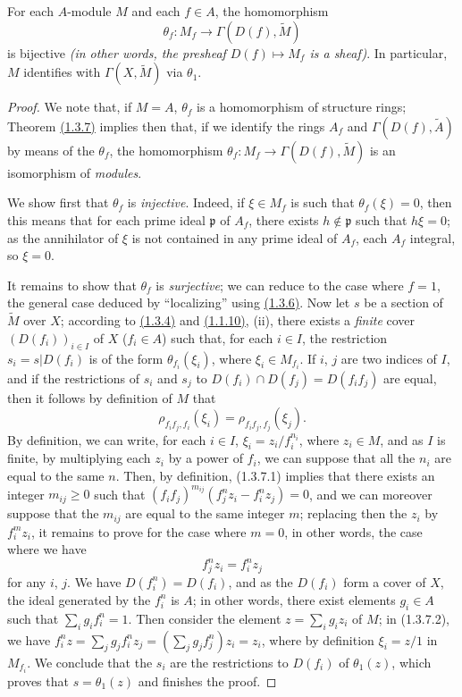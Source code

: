 \begin{thm}[1.3.7]
\label{thm-1.1.3.7}
For each $A$-module $M$ and each $f\in A$, the homomorphism
\[
  \theta_f:M_f\longrightarrow\Gamma(D(f),\widetilde{M})
\]
is bijective {\it (in other words, the presheaf $D(f)\mapsto M_f$ is a {\it sheaf})}. In
particular, $M$ identifies with $\Gamma(X,\widetilde{M})$ via $\theta_1$.
\end{thm}

\begin{proof}
\label{proof-thm-1.1.3.7}
We note that, if $M=A$, $\theta_f$ is a homomorphism of structure rings; Theorem
\hyperref[thm-1.1.3.7]{(1.3.7)} implies then that, if we identify the rings $A_f$ and
$\Gamma(D(f),\widetilde{A})$ by means of the $\theta_f$, the homomorphism
$\theta_f:M_f\to\Gamma(D(f),\widetilde{M})$ is an isomorphism of {\it modules}.

We show first that $\theta_f$ is {\it injective}. Indeed, if $\xi\in M_f$ is such that
$\theta_f(\xi)=0$, then this means that for each prime ideal $\mathfrak{p}$ of $A_f$, there
exists $h\not\in\mathfrak{p}$ such that $h\xi=0$; as the annihilator of $\xi$ is not
contained in any prime ideal of $A_f$, each $A_f$ integral, so $\xi=0$.

It remains to show that $\theta_f$ is {\it surjective}; we can reduce to the case where
$f=1$, the general case deduced by ``localizing'' using \hyperref[prop-1.1.3.6]{(1.3.6)}. Now let $s$ be a
section of $\widetilde{M}$ over $X$; according to \hyperref[defn-1.1.3.4]{(1.3.4)} and
\hyperref[prop-1.1.1.10]{(1.1.10)}, (ii), there exists a {\it finite} cover $(D(f_i))_{i\in I}$ of $X$
($f_i\in A$) such that, for each $i\in I$, the restriction $s_i=s|D(f_i)$ is of the form
$\theta_{f_i}(\xi_i)$, where $\xi_i\in M_{f_i}$. If $i$, $j$ are two indices of $I$, and if
the restrictions of $s_i$ and $s_j$ to $D(f_i)\cap D(f_j)=D(f_i f_j)$ are equal, then
it follows by definition of $M$ that
\[
  \rho_{f_i f_j,f_i}(\xi_i)=\rho_{f_i f_j,f_j}(\xi_j).
  \tag{1.3.7.1}
\]
By definition, we can write, for each $i\in I$, $\xi_i=z_i/f_i^{n_i}$, where $z_i\in M$, and
as $I$ is finite, by multiplying each $z_i$ by a power of $f_i$, we can suppose that all the
$n_i$ are equal to the same $n$. Then, by definition, (1.3.7.1) implies that there exists an
integer $m_{ij}\geqslant 0$ such that $(f_i f_j)^{m_{ij}}(f_j^n z_i-f_i^n z_j)=0$, and we can
moreover suppose that the $m_{ij}$ are equal to the same integer $m$; replacing then the
$z_i$ by $f_i^m z_i$, it remains to prove for the case where $m=0$, in other words, the case
where we have
\[
  f_j^n z_i=f_i^n z_j
  \tag{1.3.7.2}
\]
for any $i$, $j$. We have $D(f_i^n)=D(f_i)$, and as the $D(f_i)$ form a cover of $X$,
the ideal generated by the $f_i^n$ is $A$; in other words, there exist elements $g_i\in A$
such that $\sum_i g_i f_i^n=1$. Then consider the element $z=\sum_i g_i z_i$ of $M$; in
(1.3.7.2), we have $f_i^n z=\sum_j g_j f_i^n z_j=(\sum_j g_j f_j^n)z_i=z_i$, where by
definition $\xi_i=z/1$ in $M_{f_i}$. We conclude
that the $s_i$ are the restrictions to $D(f_i)$ of $\theta_1(z)$, which proves that
$s=\theta_1(z)$ and finishes the proof.
\end{proof}

